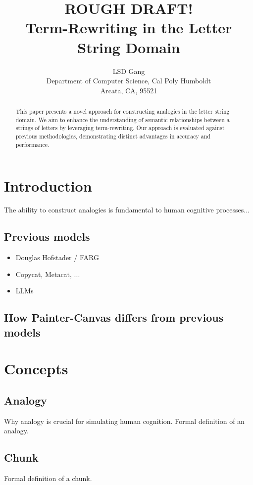 \documentclass{article}
\title{\textbf{ROUGH DRAFT!} \\ Term-Rewriting in the Letter String Domain}
\author{
  LSD Gang \\
  Department of Computer Science, Cal Poly Humboldt \\
  Arcata, CA, 95521 \\
}
\begin{document}
\maketitle
\begin{abstract}
    This paper presents a novel approach for constructing analogies in the letter string domain. We aim to enhance the understanding of semantic relationships between a strings of letters by leveraging term-rewriting. Our approach is evaluated against previous methodologies, demonstrating distinct advantages in accuracy and performance.
\end{abstract}

\tableofcontents

\pagebreak
\pagebreak

\section{Introduction}
The ability to construct analogies is fundamental to human cognitive processes...

\subsection{Previous models}
\begin{itemize}
    \item Douglas Hofstader / FARG
    \item Copycat, Metacat, ...
    \item LLMs
\end{itemize}

\subsection{How Painter-Canvas differs from previous models}

\section{Concepts}

\subsection{Analogy}
Why analogy is crucial for simulating human cognition.
Formal definition of an analogy.

\subsection{Chunk}
Formal definition of a chunk.
\end{document}
